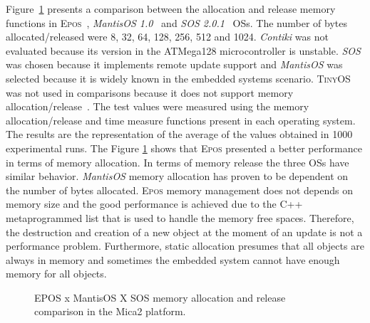 \documentclass[10pt]{sigplanconf}
\newcommand{\epos}{\textsc{Epos}}
\newcommand{\tos}{\textsc{TinyOS}}
\newcommand{\fig}[4][tb]{
  \begin{figure}[#1] {\centering{\texttt{[image: figures/\#2]}}\par}
    \caption{#3\label{fig:#2}}
  \end{figure}
}
\begin{document}
Figure~\ref{fig:mica2.pdf} presents a comparison between the allocation and release memory functions in \epos{}~\cite{Froehlich:2001}, \textit{MantisOS 1.0}~\cite{mantis}  and \textit{SOS 2.0.1}~\cite{sos} OSs. The number of bytes allocated/released were 8, 32, 64, 128, 256, 512 and 1024. \textit{Contiki} was not evaluated because its version in the ATMega128 microcontroller is unstable. \textit{SOS} was chosen because it implements remote update support and \textit{MantisOS} was selected because it is widely known in the embedded systems scenario. \tos{} was not used in comparisons because it does not support memory allocation/release~\cite{hill00system}. The test values were measured using the memory allocation/release and time measure functions present in each operating system. The results are the representation of the average of the values obtained in 1000 experimental runs. The Figure \ref{fig:mica2.pdf} shows that \epos{} presented a better performance in terms of memory allocation. In terms of memory release the three OSs have similar behavior. \textit{MantisOS} memory allocation has proven to be dependent on the number of bytes allocated. \epos{} memory management does not depends on memory size and the good performance is achieved due to the C++ metaprogrammed list that is used to handle the memory free spaces. Therefore, the destruction and creation of a new object at the moment of an update is not a performance problem. Furthermore, static allocation presumes that all objects are always in memory and sometimes the embedded system cannot have enough memory for all objects.


\fig{mica2.pdf}{EPOS x MantisOS X SOS memory allocation and release comparison in the Mica2 platform.}{width=6cm}
\end{document}
